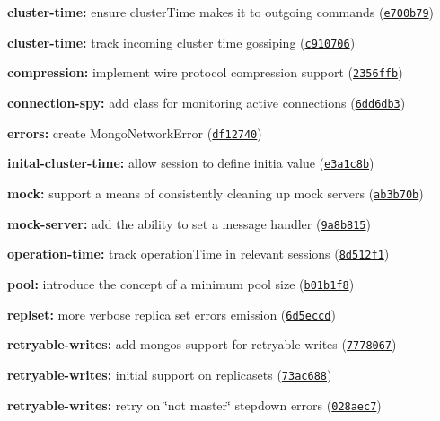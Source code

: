\begin{DoxyItemize}
\item {\bfseries cluster-\/time\+:} ensure cluster\+Time makes it to outgoing commands (\href{https://github.com/christkv/mongodb-core/commit/e700b79}{\tt e700b79})
\item {\bfseries cluster-\/time\+:} track incoming cluster time gossiping (\href{https://github.com/christkv/mongodb-core/commit/c910706}{\tt c910706})
\item {\bfseries compression\+:} implement wire protocol compression support (\href{https://github.com/christkv/mongodb-core/commit/2356ffb}{\tt 2356ffb})
\item {\bfseries connection-\/spy\+:} add class for monitoring active connections (\href{https://github.com/christkv/mongodb-core/commit/6dd6db3}{\tt 6dd6db3})
\item {\bfseries errors\+:} create Mongo\+Network\+Error (\href{https://github.com/christkv/mongodb-core/commit/df12740}{\tt df12740})
\item {\bfseries inital-\/cluster-\/time\+:} allow session to define initia value (\href{https://github.com/christkv/mongodb-core/commit/e3a1c8b}{\tt e3a1c8b})
\item {\bfseries mock\+:} support a means of consistently cleaning up mock servers (\href{https://github.com/christkv/mongodb-core/commit/ab3b70b}{\tt ab3b70b})
\item {\bfseries mock-\/server\+:} add the ability to set a message handler (\href{https://github.com/christkv/mongodb-core/commit/9a8b815}{\tt 9a8b815})
\item {\bfseries operation-\/time\+:} track operation\+Time in relevant sessions (\href{https://github.com/christkv/mongodb-core/commit/8d512f1}{\tt 8d512f1})
\item {\bfseries pool\+:} introduce the concept of a minimum pool size (\href{https://github.com/christkv/mongodb-core/commit/b01b1f8}{\tt b01b1f8})
\item {\bfseries replset\+:} more verbose replica set errors emission (\href{https://github.com/christkv/mongodb-core/commit/6d5eccd}{\tt 6d5eccd})
\item {\bfseries retryable-\/writes\+:} add mongos support for retryable writes (\href{https://github.com/christkv/mongodb-core/commit/7778067}{\tt 7778067})
\item {\bfseries retryable-\/writes\+:} initial support on replicasets (\href{https://github.com/christkv/mongodb-core/commit/73ac688}{\tt 73ac688})
\item {\bfseries retryable-\/writes\+:} retry on \char`\"{}not master\char`\"{} stepdown errors (\href{https://github.com/christkv/mongodb-core/commit/028aec7}{\tt 028aec7})

\end{DoxyItemize}
